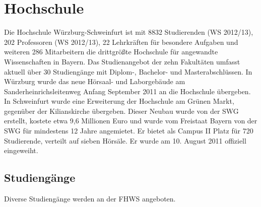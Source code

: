

\ihead{}
\chead{}
\ohead{\leftmark}

\ifoot{}
\cfoot{\pagemark}
\ofoot{}

\chapter{Hochschule}
\label{22_00_00_00_00_00_00_00_00_00}

\thispagestyle{plain}



Die Hochschule Würzburg-Schweinfurt ist mit 8832 Studierenden (WS 2012/13), 202 Professoren (WS 2012/13), 22 Lehrkräften für besondere Aufgaben und weiteren 286 Mitarbeitern die drittgrößte Hochschule für angewandte Wissenschaften in Bayern. Das Studienangebot der zehn Fakultäten umfasst aktuell über 30 Studiengänge mit Diplom-, Bachelor- und Masterabschlüssen. In Würzburg wurde das neue Hörsaal- und Laborgebäude am Sanderheinrichsleitenweg Anfang September 2011 an die Hochschule übergeben. In Schweinfurt wurde eine Erweiterung der Hochschule am Grünen Markt, gegenüber der Kilianskirche übergeben. Dieser Neubau wurde von der SWG erstellt, kostete etwa 9,6 Millionen Euro und wurde vom Freistaat Bayern von der SWG für mindestens 12 Jahre angemietet. Er bietet als Campus II Platz für 720 Studierende, verteilt auf sieben Hörsäle. Er wurde am 10. August 2011 offiziell eingeweiht.


\vskip 10mm

\section{Studiengänge}
\label{22_01_00_00_00_00_00_00_00_00}

Diverse Studiengänge werden an der \ac{FHWS} angeboten.

